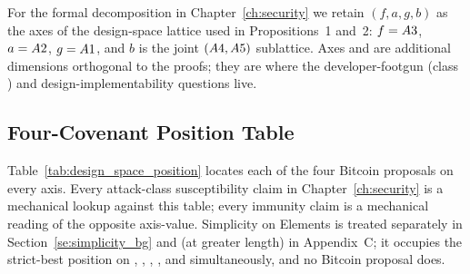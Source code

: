 For the formal decomposition in Chapter~\ref{ch:security} we retain
$(f, a, g, b)$ as the axes of the design-space lattice used in
Propositions~1 and~2: $f = A3$, $a = A2$, $g = A1$,
and $b$ is the joint $(A4, A5)$ sublattice. Axes
\axopsurf{} and \axintro{} are additional dimensions orthogonal to
the proofs; they are where the developer-footgun (class \classmode{})
and design-implementability questions live.

\subsection{Four-Covenant Position Table}
\label{ss:position_table}

Table~\ref{tab:design_space_position} locates each of the four
Bitcoin proposals on every axis. Every attack-class
susceptibility claim in Chapter~\ref{ch:security} is a mechanical
lookup against this table; every immunity claim is a mechanical
reading of the opposite axis-value. Simplicity on Elements is
treated separately in Section~\ref{se:simplicity_bg} and (at greater
length) in Appendix~C; it occupies the strict-best position on
\axauth{}, \axrevault{}, \axwdbind{}, \axrecbind{}, and \axintro{}
simultaneously, and no Bitcoin proposal does.

